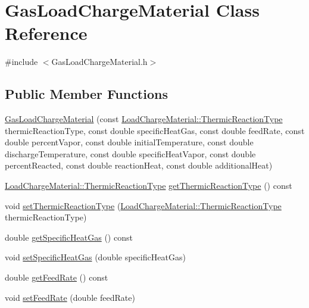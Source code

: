 \hypertarget{class_gas_load_charge_material}{}\section{Gas\+Load\+Charge\+Material Class Reference}
\label{class_gas_load_charge_material}


{\ttfamily \#include $<$Gas\+Load\+Charge\+Material.\+h$>$}

\subsection*{Public Member Functions}
\begin{DoxyCompactItemize}
\item 
\hyperlink{class_gas_load_charge_material_a4ad94a94d25bad9eaeca4947d879f35f}{Gas\+Load\+Charge\+Material} (const \hyperlink{namespace_load_charge_material_a51d4263e865a5d86236622dd3fe23fd1}{Load\+Charge\+Material\+::\+Thermic\+Reaction\+Type} thermic\+Reaction\+Type, const double specific\+Heat\+Gas, const double feed\+Rate, const double percent\+Vapor, const double initial\+Temperature, const double discharge\+Temperature, const double specific\+Heat\+Vapor, const double percent\+Reacted, const double reaction\+Heat, const double additional\+Heat)
\item 
\hyperlink{namespace_load_charge_material_a51d4263e865a5d86236622dd3fe23fd1}{Load\+Charge\+Material\+::\+Thermic\+Reaction\+Type} \hyperlink{class_gas_load_charge_material_ac801f30ccf58ce98fdb6b8cdb0a9767f}{get\+Thermic\+Reaction\+Type} () const
\item 
void \hyperlink{class_gas_load_charge_material_ac48eb07a3008f1dc0ff433353b59536d}{set\+Thermic\+Reaction\+Type} (\hyperlink{namespace_load_charge_material_a51d4263e865a5d86236622dd3fe23fd1}{Load\+Charge\+Material\+::\+Thermic\+Reaction\+Type} thermic\+Reaction\+Type)
\item 
double \hyperlink{class_gas_load_charge_material_a66e956e7a52b1032a3e8a725f26fa580}{get\+Specific\+Heat\+Gas} () const
\item 
void \hyperlink{class_gas_load_charge_material_a07bf6d4ee9161683fbeb3baad16ea7be}{set\+Specific\+Heat\+Gas} (double specific\+Heat\+Gas)
\item 
double \hyperlink{class_gas_load_charge_material_ae14ebe9b7091a491166174968505b6ee}{get\+Feed\+Rate} () const
\item 
void \hyperlink{class_gas_load_charge_material_a922b728dfd109d1c1684d7dfad82ec8e}{set\+Feed\+Rate} (double feed\+Rate)

\end{DoxyCompactItemize}
